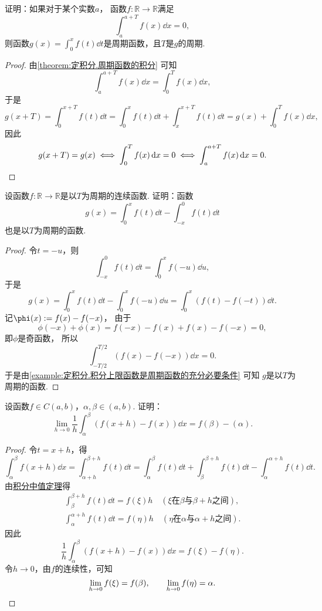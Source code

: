 \begin{example}\label{example:定积分.积分上限函数是周期函数的充分必要条件}
证明：如果对于某个实数\(a\)，
函数\(f\colon\mathbb{R}\to\mathbb{R}\)满足\[
	\int_a^{a+T} f(x) \dd{x} = 0,
\]
则函数\(g(x) = \int_0^x f(t) \dd{t}\)是周期函数，且\(T\)是\(g\)的周期.
\begin{proof}
由\cref{theorem:定积分.周期函数的积分} 可知\[
	\int_a^{a+T} f(x) \dd{x} = \int_0^T f(x) \dd{x},
\]
于是\[
	g(x+T)
	= \int_0^{x+T} f(t) \dd{t}
	= \int_0^x f(t) \dd{t} + \int_x^{x+T} f(t) \dd{t}
	= g(x) + \int_0^T f(x) \dd{x},
\]
因此\[
	g(x+T) = g(x)
	\iff
	\int_0^T f(x) \dd{x} = 0
	\iff
	\int_a^{a+T} f(x) \dd{x} = 0.
	\qedhere
\]
\end{proof}
\end{example}
\begin{example}
设函数\(f\colon\mathbb{R}\to\mathbb{R}\)是以\(T\)为周期的连续函数.
证明：函数\[
	g(x) = \int_0^x f(t) \dd{t} - \int_{-x}^0 f(t) \dd{t}
\]也是以\(T\)为周期的函数.
\begin{proof}
令\(t=-u\)，则\[
	\int_{-x}^0 f(t) \dd{t}
	= \int_0^x f(-u) \dd{u},
\]
于是\[
	g(x) = \int_0^x f(t) \dd{t} - \int_0^x f(-u) \dd{u}
	= \int_0^x (f(t) - f(-t)) \dd{t}.
\]
记\(\phi(x) \defeq f(x) - f(-x)\)，
由于\[
	\phi(-x) + \phi(x)
	= f(-x) - f(x) + f(x) - f(-x)
	= 0,
\]
即\(\phi\)是奇函数，
所以\[
	\int_{-T/2}^{T/2} (f(x) - f(-x)) \dd{x}
	= 0.
\]
于是由\cref{example:定积分.积分上限函数是周期函数的充分必要条件} 可知
\(g\)是以\(T\)为周期的函数.
\end{proof}
\end{example}

\begin{example}
设函数\(f \in C(a,b)\)，\(\alpha,\beta\in(a,b)\).
证明：\[
	\lim_{h\to0} \frac1h \int_\alpha^\beta (f(x+h) - f(x)) \dd{x}
	= f(\beta) - (\alpha).
\]
\begin{proof}
令\(t = x + h\)，得\[
	\int_\alpha^\beta f(x+h) \dd{x}
	= \int_{\alpha + h}^{\beta + h} f(t) \dd{t}
	= \int_\alpha^\beta f(t) \dd{t}
	+ \int_\beta^{\beta + h} f(t) \dd{t}
	- \int_\alpha^{\alpha + h} f(t) \dd{t}.
\]
由\hyperref[theorem:定积分.积分中值定理1推论2]{积分中值定理}得\begin{gather*}
	\int_\beta^{\beta + h} f(t) \dd{t}
	= f(\xi) h
	\quad(\text{$\xi$在$\beta$与$\beta+h$之间}), \\
	\int_\alpha^{\alpha + h} f(t) \dd{t}
	= f(\eta) h
	\quad(\text{$\eta$在$\alpha$与$\alpha+h$之间}).
\end{gather*}
因此\[
	\frac1h \int_\alpha^\beta (f(x + h) - f(x)) \dd{x}
	= f(\xi) - f(\eta).
\]
令\(h\to0\)，由\(f\)的连续性，可知\[
	\lim_{h\to0} f(\xi) = f(\beta),
	\qquad
	\lim_{h\to0} f(\eta) = \alpha.
	\qedhere
\]
\end{proof}
\end{example}
